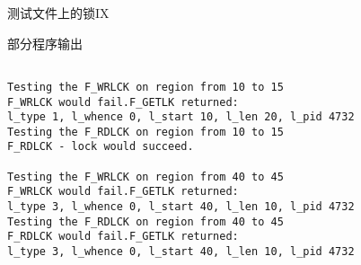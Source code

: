 \documentclass{beamer}
\begin{document}
\begin{frame}[fragile]{测试文件上的锁IX}
\begin{block}{部分程序输出}
\begin{lstlisting}

Testing the F_WRLCK on region from 10 to 15 
F_WRLCK would fail.F_GETLK returned:
l_type 1, l_whence 0, l_start 10, l_len 20, l_pid 4732
Testing the F_RDLCK on region from 10 to 15 
F_RDLCK - lock would succeed.

Testing the F_WRLCK on region from 40 to 45 
F_WRLCK would fail.F_GETLK returned:
l_type 3, l_whence 0, l_start 40, l_len 10, l_pid 4732
Testing the F_RDLCK on region from 40 to 45 
F_RDLCK would fail.F_GETLK returned:
l_type 3, l_whence 0, l_start 40, l_len 10, l_pid 4732
\end{lstlisting}
\end{block}
\end{frame}
\end{document}

